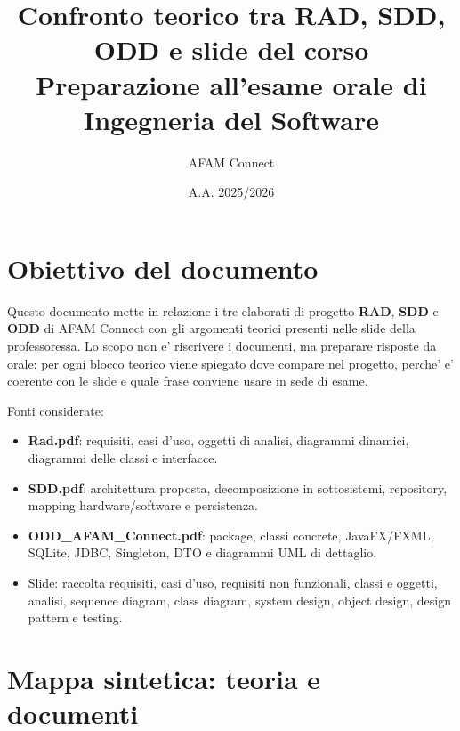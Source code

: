 ﻿\documentclass[11pt,a4paper]{article}
\title{\textbf{Confronto teorico tra RAD, SDD, ODD e slide del corso}\\
\large Preparazione all'esame orale di Ingegneria del Software}
\author{AFAM Connect}
\date{A.A. 2025/2026}
\newcommand{\doc}[1]{\textbf{#1}}
\begin{document}
\maketitle
\tableofcontents
\newpage

\section{Obiettivo del documento}

Questo documento mette in relazione i tre elaborati di progetto \doc{RAD}, \doc{SDD} e
\doc{ODD} di AFAM Connect con gli argomenti teorici presenti nelle slide della professoressa.
Lo scopo non e' riscrivere i documenti, ma preparare risposte da orale: per ogni blocco
teorico viene spiegato dove compare nel progetto, perche' e' coerente con le slide e quale
frase conviene usare in sede di esame.

Fonti considerate:
\begin{itemize}
  \item \doc{Rad.pdf}: requisiti, casi d'uso, oggetti di analisi, diagrammi dinamici,
  diagrammi delle classi e interfacce.
  \item \doc{SDD.pdf}: architettura proposta, decomposizione in sottosistemi, repository,
  mapping hardware/software e persistenza.
  \item \doc{ODD\_AFAM\_Connect.pdf}: package, classi concrete, JavaFX/FXML, SQLite,
  JDBC, Singleton, DTO e diagrammi UML di dettaglio.
  \item Slide: raccolta requisiti, casi d'uso, requisiti non funzionali, classi e oggetti,
  analisi, sequence diagram, class diagram, system design, object design, design pattern e
  testing.
\end{itemize}

\section{Mappa sintetica: teoria e documenti}
\end{document}
